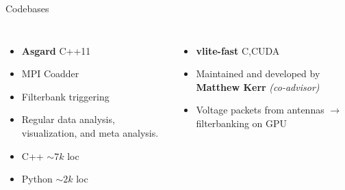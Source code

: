 \begin{frame}{Codebases}
\begin{columns}[onlytextwidth]
	\begin{itemize}
		\item \textbf{\large Asgard} \hfill C++11
		\item MPI Coadder
		\item Filterbank triggering
		\item Regular data analysis, visualization, and meta analysis.
		\item C++ $\sim 7k$ loc
		\item Python $\sim 2k$ loc
	\end{itemize}

	\begin{itemize}
		\item \textbf{\large vlite-fast} \hfill C,CUDA
		\item Maintained and developed by \textbf{ Matthew Kerr } \emph{ (co-advisor) }
		\item Voltage packets from antennas $\to$ filterbanking on GPU
	\end{itemize}
\end{columns}
\end{frame}